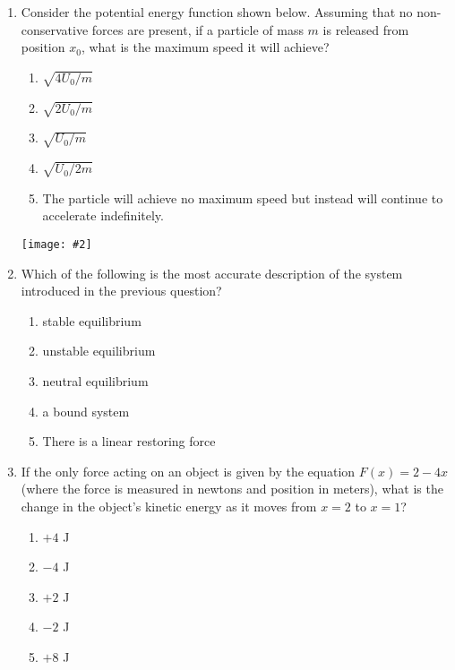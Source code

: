 \documentclass[12pt]{article}
\newcommand{\pic}[2]{\texttt{[image: \#2]}}
\begin{document}
\begin{enumerate}[leftmargin=15pt]
\item Consider the potential energy function shown below. Assuming that no
  non-conservative forces are present, if a particle of mass $m$ is released
  from position $x_0$, what is the maximum speed it will achieve?\\
  \begin{minipage}{0.7\textwidth}
    \begin{enumerate}[noitemsep,topsep=0pt]
    \item $\sqrt{4U_0/m}$
    \item $\sqrt{2U_0/m}$
    \item $\sqrt{U_0/m}$
    \item $\sqrt{U_0/2m}$
    \item The particle will achieve no maximum speed but instead will continue
      to accelerate indefinitely.
    \end{enumerate}
  \end{minipage}
  \begin{minipage}{0.3\textwidth}
    \pic{.7}{potential-well.png}
  \end{minipage}

\item Which of the following is the most accurate description of the system
  introduced in the previous question?
  \begin{enumerate}[noitemsep,topsep=0pt]
  \item stable equilibrium
  \item unstable equilibrium
  \item neutral equilibrium
  \item a bound system
  \item There is a linear restoring force
  \end{enumerate}

\item If the only force acting on an object is given by the equation
  $F(x)=2-4x$ (where the force is measured in newtons and position in meters),
  what is the change in the object's kinetic energy as it moves from $x=2$ to
  $x=1$?
  \begin{enumerate}[noitemsep,topsep=0pt]
  \item $+4$ J
  \item $-4$ J
  \item $+2$ J
  \item $-2$ J
  \item $+8$ J
  \end{enumerate}
  \newpage


\end{enumerate}
\end{document}
